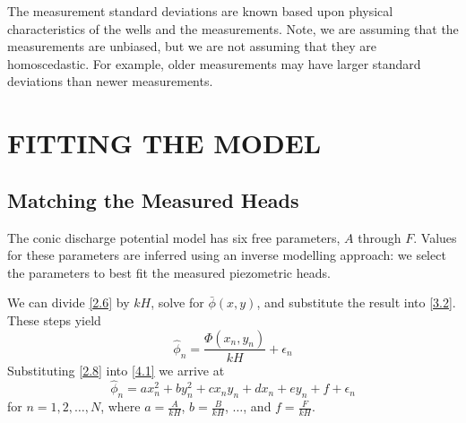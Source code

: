 \documentclass[12pt]{article}
\begin{document}
The measurement standard deviations are known based upon physical characteristics of the wells and the measurements.  Note, we are assuming that the measurements are unbiased, but we are not assuming that they are homoscedastic. For example, older measurements may have larger standard deviations than newer measurements.


\section{FITTING THE MODEL}
\subsection{Matching the Measured Heads}
The conic discharge potential model has six free parameters, $A$ through $F$.  Values for these parameters are inferred using an inverse modelling approach: we select the parameters to best fit the measured piezometric heads.

We can divide \eqref{2.6} by $kH$, solve for $\bar{\phi}(x,y)$, and substitute the result into \eqref{3.2}. These steps yield
%
\begin{equation}\label{4.1}
    \hat{\phi}_n = \frac{\Phi(x_n, y_n)}{kH} + \epsilon_n
\end{equation}
%
Substituting \eqref{2.8} into \eqref{4.1} we arrive at
%
\begin{equation} \label{4.2}
    \hat{\phi}_n = a x_n^2 + b y_n^2 + c x_n y_n + d x_n + e y_n + f + \epsilon_n
\end{equation}
%
for $n = 1, 2, \ldots, N$, where $a = \frac{A}{kH}$, $b = \frac{B}{kH}$, $ \ldots$, and $f = \frac{F}{kH}$.

\end{document}
